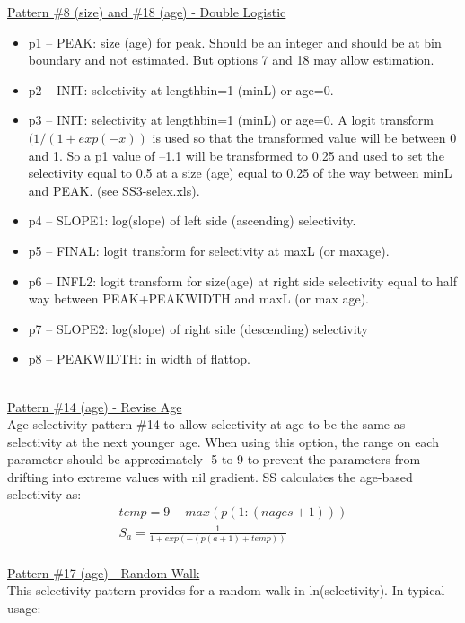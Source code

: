 \underline{Pattern \#8 (size) and \#18 (age) - Double Logistic}
\begin{itemize}
		\item  p1 – PEAK:  size (age) for peak. Should be an integer and should be at bin boundary and not estimated.  But options 7 and 18 may allow estimation.
		\item p2 – INIT:  selectivity at lengthbin=1 (minL) or age=0.
		\item p3 – INIT:  selectivity at lengthbin=1 (minL) or age=0. A logit transform $(1/(1+exp(-x))$ is used so that the transformed value will be between 0 and 1.  So a p1 value of –1.1 will be transformed to 0.25 and used to set the selectivity equal to 0.5 at a size (age) equal to 0.25 of the way between minL and PEAK.  (see SS3-selex.xls).
		\item p4 – SLOPE1:  log(slope) of left side (ascending) selectivity.
		\item p5 – FINAL:  logit transform for selectivity at maxL (or maxage).
		\item p6 – INFL2:  logit transform for size(age) at right side selectivity equal to half way between PEAK+PEAKWIDTH and maxL (or max age).
		\item p7 – SLOPE2:  log(slope) of right side (descending) selectivity
		\item p8 – PEAKWIDTH:  in width of flattop.
\end{itemize}
\hfil
\\
\underline{Pattern \#14 (age) - Revise Age}\\
Age-selectivity pattern \#14 to allow selectivity-at-age to be the same as selectivity at the next younger age.  When using this option, the range on each parameter should be approximately -5 to 9 to prevent the parameters from drifting into extreme values with nil gradient. SS calculates the age-based selectivity as:
\begin{equation}
	\begin{split}
			temp = 9 - max(p(1:(nages+1)))\\
			S_a = \frac{1}{1+exp(-(p(a+1) + temp))}
	\end{split}
\end{equation}
\hfil
\\
\underline{Pattern \#17 (age) - Random Walk}\\
This selectivity pattern provides for a random walk in ln(selectivity).  In typical usage:
